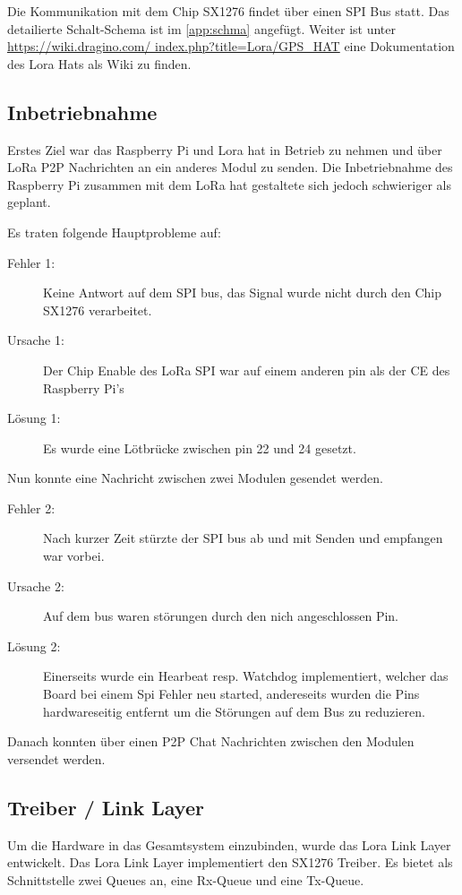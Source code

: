 \documentclass[ngerman, a4paper, 11pt]{scrartcl}
\begin{document}
Die Kommunikation mit dem Chip SX1276 findet über einen SPI Bus statt. Das detailierte Schalt-Schema ist im \cref{app:schma} angefügt.
Weiter ist unter \href{https://wiki.dragino.com/index.php?title=Lora/GPS_HAT}{https://wiki.dragino.com/ index.php?title=Lora/GPS\_HAT} eine Dokumentation des Lora Hats als Wiki zu finden.




\subsection{Inbetriebnahme}
Erstes Ziel war das Raspberry Pi und Lora hat in Betrieb zu nehmen und über LoRa P2P Nachrichten an ein anderes Modul zu senden. 
Die Inbetriebnahme des Raspberry Pi zusammen mit dem LoRa hat gestaltete sich jedoch schwieriger als geplant. 

Es traten folgende Hauptprobleme auf:

\begin{description}
	\item[Fehler 1:] Keine Antwort auf dem SPI bus, das Signal wurde nicht durch den Chip SX1276 verarbeitet.
	\item[Ursache 1:] Der Chip Enable des LoRa SPI war auf einem anderen pin als der CE des Raspberry Pi's
	\item[Lösung 1:] Es wurde eine Lötbrücke zwischen pin 22 und 24 gesetzt.
\end{description}

Nun konnte eine Nachricht zwischen zwei Modulen gesendet werden.

\begin{description}
	\item[Fehler 2:] Nach kurzer Zeit stürzte der SPI bus ab und mit Senden und empfangen war vorbei.
	\item[Ursache 2:] Auf dem bus waren störungen durch den nich angeschlossen Pin.
	\item[Lösung 2:] Einerseits wurde ein Hearbeat resp. Watchdog implementiert, welcher das Board bei einem Spi Fehler neu started, andereseits wurden die Pins hardwareseitig entfernt um die Störungen auf dem Bus zu reduzieren.
\end{description}

Danach konnten über einen P2P Chat Nachrichten zwischen den Modulen versendet werden.

\subsection{Treiber / Link Layer}
Um die Hardware in das Gesamtsystem einzubinden, wurde das Lora Link Layer entwickelt.
Das Lora Link Layer implementiert den SX1276 Treiber.
Es bietet als Schnittstelle zwei Queues an, eine Rx-Queue und eine Tx-Queue.
\end{document}
